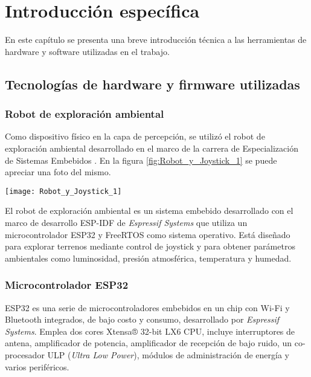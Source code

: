 \chapter{Introducción específica} %

\label{Chapter2}



En este capítulo se presenta una breve introducción técnica a las herramientas de hardware y software utilizadas en el trabajo.

\section{Tecnologías de hardware y firmware utilizadas}


\subsection{Robot de exploración ambiental}

Como dispositivo físico en la capa de percepción, se utilizó el robot de exploración ambiental desarrollado en el marco de la carrera de Especialización de Sistemas Embebidos \citep{cese_gonzalo_memoria}. En la figura \ref{fig:Robot_y_Joystick_1} se puede apreciar una foto del mismo.


\begin{center}
   \texttt{[image: Robot\_y\_Joystick\_1]}
   \label{fig:Robot_y_Joystick_1}
\end{center}

El robot de exploración ambiental es un sistema embebido desarrollado con el marco de desarrollo ESP-IDF \cite{ESPIDF_home} de \textit{Espressif Systems} que utiliza un microcontrolador ESP32 \cite{ESP32} y FreeRTOS \citep{FreeRTOS} como sistema operativo. Está diseñado para explorar terrenos mediante control de joystick y para obtener parámetros ambientales como luminosidad, presión atmosférica, temperatura y humedad.

\subsection{Microcontrolador ESP32}


ESP32 \cite{ESP32} es una serie de microcontroladores embebidos en un chip con Wi-Fi y Bluetooth integrados, de bajo costo y consumo, desarrollado por \textit{Espressif Systems}. Emplea dos cores Xtensa® 32-bit LX6 CPU, incluye interruptores de antena, amplificador de potencia, amplificador de recepción de bajo ruido, un co-procesador ULP (\textit{Ultra Low Power}), módulos de administración de energía y varios periféricos.


